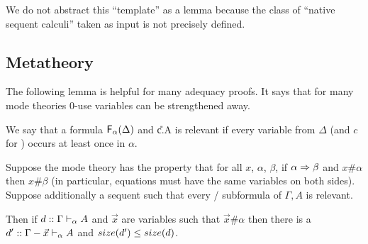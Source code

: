 We do not abstract this ``template'' as a lemma because the class of
``native sequent calculi'' taken as input is not precisely
defined.  


\subsection{Metatheory}

The following lemma is helpful for many adequacy proofs.  It says that
for many mode theories 0-use variables can be strengthened away.  

\begin{lemma} \label{lem:0-use-strengthening}
We say that a formula $\mathsf{F}_{\alpha}(\Delta)$ and \U{c.\alpha}{\Delta}{A}
is relevant if every variable from $\Delta$ (and $c$ for \Usymb) occurs
at least once in $\alpha$.

Suppose the mode theory has the property that for all $x$, $\alpha$,
$\beta$, if $\alpha \Rightarrow \beta$ and $x \# \alpha$ then $x \# \beta$ (in
particular, equations must have the same variables on both sides).
Suppose additionally a sequent  such that every
\Fsymb/\Usymb\/ subformula of $\Gamma,A$ is relevant.

Then if $d :: \Gamma \vdash_{\alpha} A$ and $\vec{x}$ are variables such
that $\vec{x} \# \alpha$ then there is a $d' ::
\Gamma-\vec{x} \vdash_{\alpha} A$ and $size(d') \le size(d)$.
\end{lemma}

